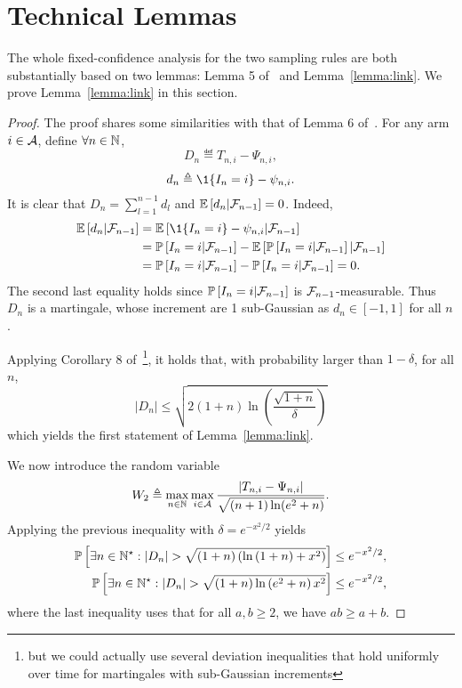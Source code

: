 \section{Technical Lemmas}\label{app:lemmas}

The whole fixed-confidence analysis for the two sampling rules are both substantially based on two lemmas: Lemma 5 of~\cite{qin2017ttei} and Lemma~\ref{lemma:link}. We prove Lemma~\ref{lemma:link} in this section.

\restatewtwo*

\begin{proof}

The proof shares some similarities with that of Lemma 6 of~\cite{qin2017ttei}.
For any arm $i\in\mathcal{A}$, define $\forall n\in{\mathbb N}$,
\[
    D_n \eqdef T_{n,i} - \Psi_{n,i},
\]
\[
    d_n \eqdef \1{\{I_n=i\}} - \psi_{n,i}.
\]
It is clear that $D_n = \sum_{l=1}^{n-1} d_l$ and $\mathbb{E}\left[d_n|\mathcal{F}_{n-1}\right] = 0$. Indeed,
\begin{align*}
    \EE{d_n|\cF_{n-1}} &= \EE{\1{\{I_n=i\}} - \psi_{n,i}|\cF_{n-1}} \\
                       &= \PP{I_n=i|\cF_{n-1}} - \EE{\PP{I_n=i|\cF_{n-1}}|\cF_{n-1}} \\
                       &= \PP{I_n=i|\cF_{n-1}} - \PP{I_n=i|\cF_{n-1}} = 0.
\end{align*}
The second last equality holds since $\mathbb{P}\left[I_n=i|\mathcal{F}_{n-1}\right]$ is $\mathcal{F}_{n-1}$-measurable. Thus $D_n$ is a martingale, whose increment are 1 sub-Gaussian as $d_n \in [-1,1]$ for all $n$. 

Applying Corollary 8 of~\cite{abbasi-yadkori2012}\footnote{but we could actually use several deviation inequalities that hold uniformly over time for martingales with sub-Gaussian increments}, it holds that, with probability larger than $1-\delta$, for all $n$,
\[
    |D_n| \leq \sqrt{2\left(1+n\right)\ln\left(\frac{\sqrt{1+n}}{\delta}\right)}
\]
which yields the first statement of Lemma~\ref{lemma:link}.

We now introduce the random variable
\[
    W_2 \triangleq \max_{n\in{\mathbb N}}\max_{i\in\mathcal{A}} \frac{|T_{n,i}-\Psi_{n,i}|}{\sqrt{(n+1)\ln(e^2+n)}}.
\]
Applying the previous inequality with $\delta = e^{-x^2 / 2}$ yields 
\begin{align*}
          \mathbb{P}\left[\exists n \in \mathbb{N}^\star : |D_n | > \sqrt{\left(1+n\right)\left(\ln\left(1+n \right)+x^2\right)}\right] &\leq e^{-x^2 / 2}, \\
          \mathbb{P}\left[\exists n \in \mathbb{N}^\star : |D_n | > \sqrt{\left(1+n\right)\ln\left(e^2+n \right)x^2}\right] &\leq e^{-x^2 / 2},
\end{align*}
where the last inequality uses that for all $a,b \geq 2$, we have $ab \geq a+b$. 


\end{proof}

